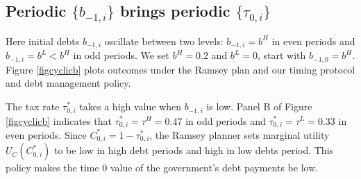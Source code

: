 \documentclass[12pt]{article}
\begin{document}
\subsection{Periodic $\{b_{-1,i}\}$ brings periodic $\{\tau_{0,i}\}$}\label{subsecperiodicb}  %
Here initial debts   $b_{-1, i}$ oscillate between two levels: 
$b_{-1, i} = b^H$ in even  periods and $b_{-1, i} = b^L<b^H$  in odd periods. We set $b^H=0.2$ and $b^L=0$, start with $b_{-1,0}=b^H$.  Figure \ref{figcyclicb} plots outcomes under the  Ramsey plan and our timing protocol and debt management policy.


The tax rate $\tau_{0, i}^\ast$   takes  %
a high value when  $b_{-1, i}$ is low.  Panel B of Figure \ref{figcyclicb} indicates that $\tau_{0, i}^\ast = \tau^H =0.47$  in odd periods and $\tau_{0, i}^\ast = \tau^L =0.33$ in   even periods.  %
Since $C _{0,i}^\ast=1-\tau_{0,i}^\ast$, the Ramsey planner  sets    marginal utility $U_C(C _{0,i}^\ast)$ to be low in  high debt periods  and   high %
in  low debts period. This policy makes  the time 0 value of the government's debt payments be   low.



\end{document}
